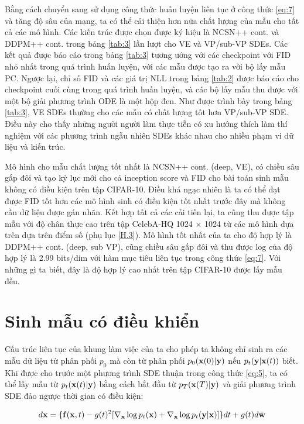 \documentclass{article} %
\begin{document}
Bằng cách chuyển sang sử dụng công thức huấn luyện liên tục ở công thức \ref{eq:7} và tăng độ sâu của mạng, ta có thể cải thiện hơn nữa chất lượng của mẫu cho tất cả các mô hình.
Các kiến trúc được chọn được ký hiệu là NCSN++ cont. và DDPM++ cont. trong bảng \ref{tab:3} lần lượt cho VE và VP/sub-VP SDEs.
Các kết quả được báo cáo trong bảng \ref{tab:3} tương ướng với các checkpoint với FID nhỏ nhất trong quá trình huấn luyện, với các mẫu được tạo ra với bộ lấy mẫu PC.
Ngược lại, chỉ số FID và các giá trị NLL trong bảng \ref{tab:2} được báo cáo cho checkpoint cuối cùng trong quá trình huấn luyện, và các bộ lấy mẫu thu được với một bộ giải phương trình ODE là một hộp đen.
Như được trình bày trong bảng \ref{tab:3}, VE SDEs thường cho các mẫu có chất lượng tốt hơn VP/sub-VP SDE.
Điều này cho thấy những người người làm thực tiễn có xu hướng thích làm thí nghiệm với các phương trình ngẫu nhiên SDEs khác nhau cho nhiều phạm vi dữ liệu và kiến trúc.

Mô hình cho mẫu chất lượng tốt nhất là NCSN++ cont. (deep, VE), có chiều sâu gấp đôi và tạo kỷ lục mới cho cả inception score và FID cho bài toán sinh mẫu không có điều kiện trên tập CIFAR-10.
Điều khá ngạc nhiên là ta có thể đạt được FID tốt hơn các mô hình sinh có điều kiện tốt nhất trước đây mà không cần dữ liệu được gán nhãn.
Kết hợp tất cả các cải tiến lại, ta cũng thu được tập mẫu với độ chân thực cao trên tập CelebA-HQ 1024 $\times$ 1024 từ các mô hình dựa trên dựa trên điểm số (phụ lục \ref{H.3}).
Mô hình tốt nhất của ta cho độ hợp lý là DDPM++ cont. (deep, sub VP), cũng chiều sâu gấp đôi và thu được log của độ hợp lý là 2.99 bits/dim với hàm mục tiêu liên tục trong công thức \ref{eq:7}.
Với những gì ta biết, đây là độ hợp lý cao nhất trên tập CIFAR-10 được lấy mẫu đều.

\section{Sinh mẫu có điều khiển}

Cấu trúc liên tục của khung làm việc của ta cho phép ta không chỉ sinh ra các mẫu dữ liệu từ phân phối $p_0$ mà còn từ phân phối $p_0 (\bold{x}(0) \vert \bold{y})$ nếu $p_t (\bold{y} \vert \bold{x}(t))$ biết.
Khi được cho trước một phương trình SDE thuận trong công thức \ref{eq:5}, ta có thể lấy mẫu từ $p_t(\bold{x}(t) \vert \bold{y})$ bằng cách bắt đầu từ $p_T (\bold{x}(T) \vert \bold{y})$ và giải phương trình SDE đảo ngược thời gian có điều kiện:

\begin{equation} \label{eq:14}
    d \bold{x} = \lbrace \bold{f}(\bold{x}, t) - g (t)^2 \lbrack \nabla_{\bold{x}} \log p_t(\bold{x}) + \nabla_{\bold{x}} \log p_t (\bold{y} \vert \bold{x}) \rbrack \rbrace dt + g(t) d \bar{\bold{w}}
\end{equation}
\end{document}
